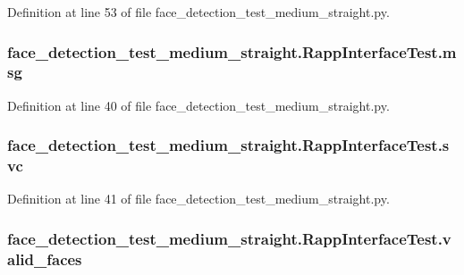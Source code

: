 Definition at line 53 of file face\-\_\-detection\-\_\-test\-\_\-medium\-\_\-straight.\-py.

\hypertarget{classface__detection__test__medium__straight_1_1RappInterfaceTest_abbc3d0f27d103717c1f244fa5c7bb66d}{
\subsubsection[{msg}]{\setlength{\rightskip}{0pt plus 5cm}face\-\_\-detection\-\_\-test\-\_\-medium\-\_\-straight.\-Rapp\-Interface\-Test.\-msg}}\label{classface__detection__test__medium__straight_1_1RappInterfaceTest_abbc3d0f27d103717c1f244fa5c7bb66d}


Definition at line 40 of file face\-\_\-detection\-\_\-test\-\_\-medium\-\_\-straight.\-py.

\hypertarget{classface__detection__test__medium__straight_1_1RappInterfaceTest_a5b93ba7d43d9feaa4213014177a9f7f6}{
\subsubsection[{svc}]{\setlength{\rightskip}{0pt plus 5cm}face\-\_\-detection\-\_\-test\-\_\-medium\-\_\-straight.\-Rapp\-Interface\-Test.\-svc}}\label{classface__detection__test__medium__straight_1_1RappInterfaceTest_a5b93ba7d43d9feaa4213014177a9f7f6}


Definition at line 41 of file face\-\_\-detection\-\_\-test\-\_\-medium\-\_\-straight.\-py.

\hypertarget{classface__detection__test__medium__straight_1_1RappInterfaceTest_a43b16f96ecb1d93c469b857dedcd0575}{
\subsubsection[{valid\-\_\-faces}]{\setlength{\rightskip}{0pt plus 5cm}face\-\_\-detection\-\_\-test\-\_\-medium\-\_\-straight.\-Rapp\-Interface\-Test.\-valid\-\_\-faces}}\label{classface__detection__test__medium__straight_1_1RappInterfaceTest_a43b16f96ecb1d93c469b857dedcd0575}


